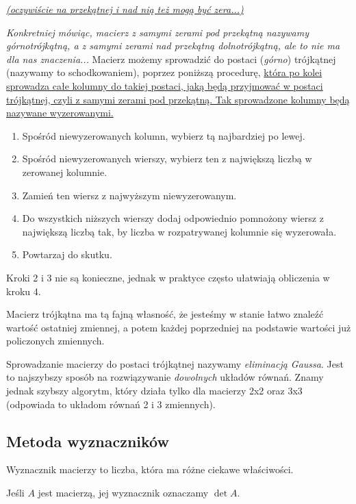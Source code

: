 \documentclass{article}
\theoremstyle{remark}
\begin{document}
\textit{\ul{(oczywiście na przekątnej i nad nią też mogą być zera...)}}

\textit{Konkretniej mówiąc, macierz z samymi zerami pod przekątną nazywamy górnotrójkątną,
a z samymi zerami nad przekątną dolnotrójkątną,
ale to nie ma dla nas znaczenia...}
Macierz możemy sprowadzić do postaci (\textit{górno}) trójkątnej (nazywamy to schodkowaniem), 
poprzez poniższą procedurę, \ul{która po kolei sprowadza całe kolumny do takiej postaci,
jaką będą przyjmować w postaci trójkątnej, czyli z samymi zerami pod przekątną.
Tak sprowadzone kolumny będą nazywane wyzerowanymi.}


\begin{enumerate}
  \item Spośród niewyzerowanych kolumn, wybierz tą najbardziej po lewej.
  \item Spośród niewyzerowanych wierszy, wybierz ten z największą liczbą w zerowanej 
  kolumnie.
  \item Zamień ten wiersz z najwyższym niewyzerowanym. 
  \item Do wszystkich niższych wierszy dodaj odpowiednio pomnożony wiersz z największą
  liczbą tak, by liczba w rozpatrywanej kolumnie się wyzerowała.
  \item Powtarzaj do skutku.
\end{enumerate}
Kroki 2 i 3 nie są konieczne, jednak w praktyce często ułatwiają obliczenia w kroku 4.

Macierz trójkątna ma tą fajną własność, że jesteśmy w stanie łatwo znaleźć wartość 
ostatniej zmiennej, a potem każdej poprzedniej na podstawie wartości już policzonych zmiennych.

Sprowadzanie macierzy do postaci trójkątnej nazywamy \textit{eliminacją Gaussa}.
Jest to najszybszy sposób na rozwiązywanie \textit{dowolnych} układów równań. Znamy jednak
szybszy algorytm, który działa tylko dla macierzy 2x2 oraz 3x3 (odpowiada to układom
równań 2 i 3 zmiennych).

\subsection{Metoda wyznaczników}
Wyznacznik macierzy to liczba, która ma różne ciekawe właściwości.

Jeśli $A$ jest macierzą, jej wyznacznik oznaczamy $\det A$.
\end{document}
